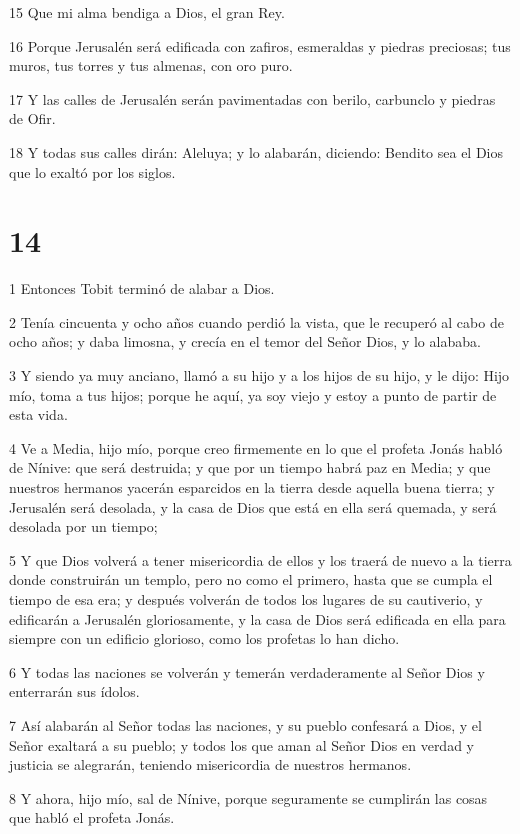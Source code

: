 \par 15 Que mi alma bendiga a Dios, el gran Rey.
\par 16 Porque Jerusalén será edificada con zafiros, esmeraldas y piedras preciosas; tus muros, tus torres y tus almenas, con oro puro.
\par 17 Y las calles de Jerusalén serán pavimentadas con berilo, carbunclo y piedras de Ofir.
\par 18 Y todas sus calles dirán: Aleluya; y lo alabarán, diciendo: Bendito sea el Dios que lo exaltó por los siglos.

\chapter{14}

\par 1 Entonces Tobit terminó de alabar a Dios.
\par 2 Tenía cincuenta y ocho años cuando perdió la vista, que le recuperó al cabo de ocho años; y daba limosna, y crecía en el temor del Señor Dios, y lo alababa.
\par 3 Y siendo ya muy anciano, llamó a su hijo y a los hijos de su hijo, y le dijo: Hijo mío, toma a tus hijos; porque he aquí, ya soy viejo y estoy a punto de partir de esta vida.
\par 4 Ve a Media, hijo mío, porque creo firmemente en lo que el profeta Jonás habló de Nínive: que será destruida; y que por un tiempo habrá paz en Media; y que nuestros hermanos yacerán esparcidos en la tierra desde aquella buena tierra; y Jerusalén será desolada, y la casa de Dios que está en ella será quemada, y será desolada por un tiempo;
\par 5 Y que Dios volverá a tener misericordia de ellos y los traerá de nuevo a la tierra donde construirán un templo, pero no como el primero, hasta que se cumpla el tiempo de esa era; y después volverán de todos los lugares de su cautiverio, y edificarán a Jerusalén gloriosamente, y la casa de Dios será edificada en ella para siempre con un edificio glorioso, como los profetas lo han dicho.
\par 6 Y todas las naciones se volverán y temerán verdaderamente al Señor Dios y enterrarán sus ídolos.
\par 7 Así alabarán al Señor todas las naciones, y su pueblo confesará a Dios, y el Señor exaltará a su pueblo; y todos los que aman al Señor Dios en verdad y justicia se alegrarán, teniendo misericordia de nuestros hermanos.
\par 8 Y ahora, hijo mío, sal de Nínive, porque seguramente se cumplirán las cosas que habló el profeta Jonás.
